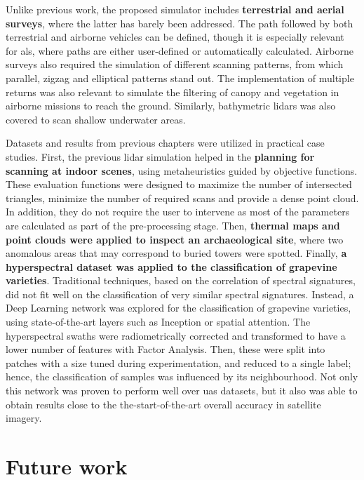 Unlike previous work, the proposed simulator includes \textbf{terrestrial and aerial surveys}, where the latter has barely been addressed. The path followed by both terrestrial and airborne vehicles can be defined, though it is especially relevant for \acrshort{als}, where paths are either user-defined or automatically calculated. Airborne surveys also required the simulation of different scanning patterns, from which parallel, zigzag and elliptical patterns stand out. The implementation of multiple returns was also relevant to simulate the filtering of canopy and vegetation in airborne missions to reach the ground. Similarly, bathymetric \acrshort{lidar}s was also covered to scan shallow underwater areas. 

Datasets and results from previous chapters were utilized in practical case studies. First, the previous \acrshort{lidar} simulation helped in the \textbf{planning for scanning at indoor scenes}, using metaheuristics guided by objective functions. These evaluation functions were designed to maximize the number of intersected triangles, minimize the number of required scans and provide a dense point cloud. In addition, they do not require the user to intervene as most of the parameters are calculated as part of the pre-processing stage. Then, \textbf{thermal maps and point clouds were applied to inspect an archaeological site}, where two anomalous areas that may correspond to buried towers were spotted. Finally, \textbf{a hyperspectral dataset was applied to the classification of grapevine varieties}. Traditional techniques, based on the correlation of spectral signatures, did not fit well on the classification of very similar spectral signatures. Instead, a Deep Learning network was explored for the classification of grapevine varieties, using state-of-the-art layers such as Inception or spatial attention. The hyperspectral swaths were radiometrically corrected and transformed to have a lower number of features with Factor Analysis. Then, these were split into patches with a size tuned during experimentation, and reduced to a single label; hence, the classification of samples was influenced by its neighbourhood. Not only this network was proven to perform well over \acrshort{uas} datasets, but it also was able to obtain results close to the the-start-of-the-art overall accuracy in satellite imagery.  

\section{Future work}

